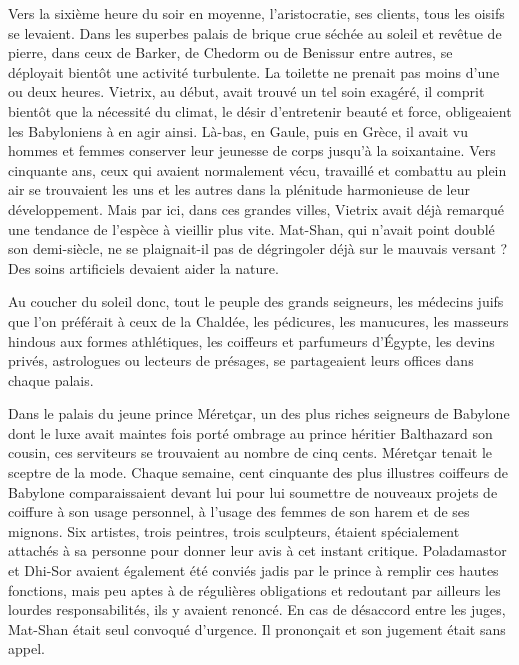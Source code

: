 \documentclass[a4paper, 11pt, oneside, polutonikogreek, french]{article}
\begin{document}
\bigskip
\centerline{\EightStarTaper}
\centerline{\EightStarTaper\EightStarTaper}
\bigskip

Vers la sixième heure du soir en moyenne, l'aristocratie, ses clients, tous les oisifs se levaient. Dans les superbes palais de brique crue séchée au soleil et revêtue de pierre, dans ceux de Barker, de Chedorm ou de Benissur entre autres, se déployait bientôt une activité turbulente. La toilette ne prenait pas moins d'une ou deux heures. Vietrix, au début, avait trouvé un tel soin exagéré, il comprit bientôt que la nécessité du climat, le désir d'entretenir beauté et force, obligeaient les Babyloniens à en agir ainsi. Là-bas, en Gaule, puis en Grèce, il avait vu hommes et femmes conserver leur jeunesse de corps jusqu'à la soixantaine. Vers cinquante ans, ceux qui avaient normalement vécu, travaillé et combattu au plein air se trouvaient les uns et les autres dans la plénitude harmonieuse de leur développement. Mais par ici, dans ces grandes villes, Vietrix avait déjà remarqué une tendance de l'espèce à vieillir plus vite. Mat-Shan, qui n'avait point doublé son demi-siècle, ne se plaignait-il pas de dégringoler déjà sur le mauvais versant ? Des soins artificiels devaient aider la nature.

Au coucher du soleil donc, tout le peuple des grands seigneurs, les médecins juifs que l'on préférait à ceux de la Chaldée, les pédicures, les manucures, les masseurs hindous aux formes athlétiques, les coiffeurs et parfumeurs d'Égypte, les devins privés, astrologues ou lecteurs de présages, se partageaient leurs offices dans chaque palais.

\bigskip
\centerline{\EightStarTaper}
\centerline{\EightStarTaper\EightStarTaper}
\bigskip

Dans le palais du jeune prince Méretçar, un des plus riches seigneurs de Babylone dont le luxe avait maintes fois porté ombrage au prince héritier Balthazard son cousin, ces serviteurs se trouvaient au nombre de cinq cents. Méretçar tenait le sceptre de la mode. Chaque semaine, cent cinquante des plus illustres coiffeurs de Babylone comparaissaient devant lui pour lui soumettre de nouveaux projets de coiffure à son usage personnel, à l'usage des femmes de son harem et de ses mignons. Six artistes, trois peintres, trois sculpteurs, étaient spécialement attachés à sa personne pour donner leur avis à cet instant critique. Poladamastor et Dhi-Sor avaient également été conviés jadis par le prince à remplir ces hautes fonctions, mais peu aptes à de régulières obligations et redoutant par ailleurs les lourdes responsabilités, ils y avaient renoncé. En cas de désaccord entre les juges, Mat-Shan était seul convoqué d'urgence. Il prononçait et son jugement était sans appel.
\end{document}
